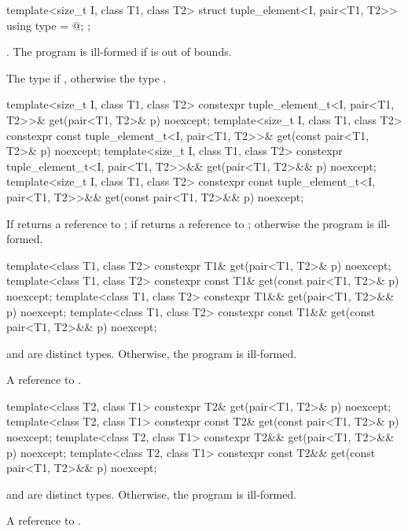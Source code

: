 %
\begin{itemdecl}
template<size_t I, class T1, class T2>
  struct tuple_element<I, pair<T1, T2>> {
    using type = @\seebelow@ ;
  };
\end{itemdecl}
\begin{itemdescr}
\pnum
\requires {}. The program is ill-formed if  is out of bounds.

\pnum
\ctype The type  if , otherwise the type .
\end{itemdescr}

%
\begin{itemdecl}
template<size_t I, class T1, class T2>
  constexpr tuple_element_t<I, pair<T1, T2>>& get(pair<T1, T2>& p) noexcept;
template<size_t I, class T1, class T2>
  constexpr const tuple_element_t<I, pair<T1, T2>>& get(const pair<T1, T2>& p) noexcept;
template<size_t I, class T1, class T2>
  constexpr tuple_element_t<I, pair<T1, T2>>&& get(pair<T1, T2>&& p) noexcept;
template<size_t I, class T1, class T2>
  constexpr const tuple_element_t<I, pair<T1, T2>>&& get(const pair<T1, T2>&& p) noexcept;
\end{itemdecl}
\begin{itemdescr}

\pnum
\returns
If  returns a reference to ;
if  returns a reference to ;
otherwise the program is ill-formed.
\end{itemdescr}

%
\begin{itemdecl}
template<class T1, class T2>
  constexpr T1& get(pair<T1, T2>& p) noexcept;
template<class T1, class T2>
  constexpr const T1& get(const pair<T1, T2>& p) noexcept;
template<class T1, class T2>
  constexpr T1&& get(pair<T1, T2>&& p) noexcept;
template<class T1, class T2>
  constexpr const T1&& get(const pair<T1, T2>&& p) noexcept;
\end{itemdecl}
\begin{itemdescr}
\pnum
\requires {} and  are distinct types. Otherwise, the program is ill-formed.

\pnum
\returns
A reference to .
\end{itemdescr}

%
\begin{itemdecl}
template<class T2, class T1>
  constexpr T2& get(pair<T1, T2>& p) noexcept;
template<class T2, class T1>
  constexpr const T2& get(const pair<T1, T2>& p) noexcept;
template<class T2, class T1>
  constexpr T2&& get(pair<T1, T2>&& p) noexcept;
template<class T2, class T1>
  constexpr const T2&& get(const pair<T1, T2>&& p) noexcept;
\end{itemdecl}
\begin{itemdescr}

\pnum
\requires {} and  are distinct types. Otherwise, the program is ill-formed.

\pnum
\returns
A reference to .
\end{itemdescr}

